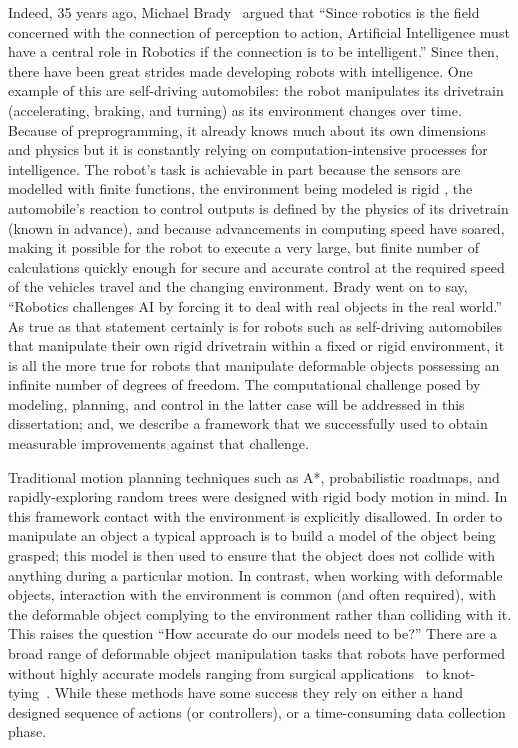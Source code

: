 Indeed, 35 years ago, Michael Brady~\cite{BRADY198579} argued that ``Since robotics is the field concerned with the connection of perception to action, Artificial Intelligence must have a central role in Robotics if the connection is to be intelligent.'' Since then, there have been great strides made developing robots with intelligence. One example of this are self-driving automobiles: the robot manipulates its drivetrain (accelerating, braking, and turning) as its environment changes over time. Because of preprogramming, it already knows much about its own dimensions and physics but it is constantly relying on computation-intensive processes for intelligence. The robot’s task is achievable in part because the sensors are modelled with finite functions, the environment being modeled is rigid , the automobile's reaction to control outputs is defined by the physics of its drivetrain (known in advance), and because advancements in computing speed have soared, making it possible for the robot to execute a very large, but finite number of calculations quickly enough for secure and accurate control at the required speed of the vehicles travel and the changing environment. Brady went on to say, ``Robotics challenges AI by forcing it to deal with real objects in the real world.'' As true as that statement certainly is for robots such as self-driving automobiles that manipulate their own rigid drivetrain within a fixed or rigid environment, it is all the more true for robots that manipulate deformable objects possessing an infinite number of degrees of freedom. The computational challenge posed by modeling, planning, and control in the latter case will be addressed in this dissertation; and, we describe a framework that we successfully used to obtain measurable improvements against that challenge.

Traditional motion planning techniques such as A*, probabilistic roadmaps, and rapidly-exploring random trees were designed with rigid body motion in mind. In this framework contact with the environment is explicitly disallowed. In order to manipulate an object a typical approach is to build a model of the object being grasped; this model is then used to ensure that the object does not collide with anything during a particular motion. In contrast, when working with deformable objects, interaction with the environment is common (and often required), with the deformable object complying to the environment rather than colliding with it. This raises the question ``How accurate do our models need to be?'' There are a broad range of deformable object manipulation tasks that robots have performed without highly accurate models ranging from surgical applications~\cite{Wang2018} to knot-tying~\cite{Huang2015}. While these methods have some success they rely on either a hand designed sequence of actions (or controllers), or a time-consuming data collection phase.

